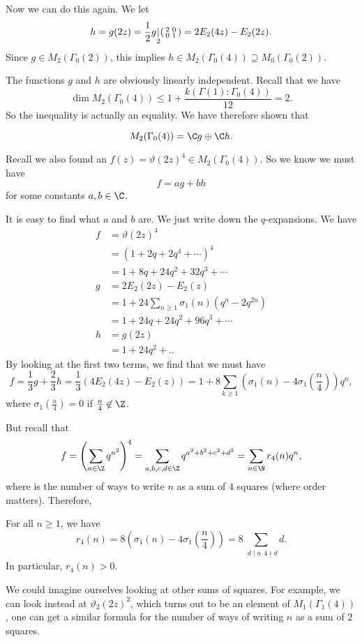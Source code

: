 \documentclass[a4paper]{article}
\begin{document}
Now we can do this again. We let
\[
  h = g(2z) = \frac{1}{2} g\underset{2}{|}
  \begin{psmallmatrix}
    2 & 0\\
    0 & 1
  \end{psmallmatrix} = 2 E_2(4z) - E_2(2z).
\]
Since $g \in M_2(\Gamma_0(2))$, this implies $h \in M_2(\Gamma_0(4))\supseteq M_0 (\Gamma_0(2))$.

The functions $g$ and $h$ are obviously linearly independent. Recall that we have
\[
  \dim M_2(\Gamma_0(4)) \leq 1 + \frac{k(\Gamma(1): \Gamma_0(4))}{12} = 2.
\]
So the inequality is actually an equality. We have therefore shown that
\begin{thm}
  \[
    M_2(\Gamma_0(4)) = \C g \oplus \C h.
  \]
\end{thm}

Recall we also found an $f(z) = \vartheta(2z)^{4} \in M_2(\Gamma_0(4))$. So we know we must have
\[
  f = ag + bh
\]
for some constants $a, b \in \C$.

It is easy to find what $a$ and $b$ are. We just write down the $q$-expansions. We have
\begin{align*}
  f &= \vartheta(2z)^4 \\
  &= (1 + 2q + 2q^4 + \cdots)^4\\
  &= 1 + 8q + 24 q^2 + 32 q^3 + \cdots\\
  g &= 2 E_2(2z) - E_2(z)\\
  &= 1 + 24 \sum_{n \geq 1 } \sigma_1(n) (q^n - 2 q^{2n})\\
  &= 1 + 24q + 24 q^2 + 96 q^3 + \cdots\\
  h &= g(2z)\\
  &= 1 + 24 q^2 + ..
\end{align*}
By looking at the first two terms, we find that we must have
\[
  f = \frac{1}{3}g + \frac{2}{3} h = \frac{1}{3} (4 E_2(4z) - E_2(z)) = 1 + 8 \sum_{k \geq 1} \left(\sigma_1(n) - 4 \sigma_1\left(\frac{n}{4}\right)\right) q^n,
\]
where $\sigma_1\left(\frac{n}{4}\right) = 0$ if $\frac{n}{4} \not \in \Z$.

But recall that
\[
  f = \left(\sum_{n \in \Z} q^{n^2}\right)^4 = \sum_{a, b, c, d \in \Z} q^{a^2 + b^2 + c^2 + d^2} = \sum_{n \in \N} r_4(n) q^n,
\]
where  is the number of ways to write $n$ as a sum of $4$ squares (where order matters). Therefore,
\begin{thm}
  For all $n \geq 1$, we have
  \[
    r_4(n) = 8\left(\sigma_1(n) - 4 \sigma_1\left(\frac{n}{4}\right)\right) = 8 \sum_{\substack{d \mid n}{4 \nmid d}} d.
  \]
  In particular, $r_4(n) > 0$.
\end{thm}
We could imagine ourselves looking at other sums of squares. For example, we can look instead at $\vartheta_2(2z)^2$, which turns out to be an element of $M_1(\Gamma_1(4))$, one can get a similar formula for the number of ways of writing $n$ as a sum of $2$ squares.
\end{document}
